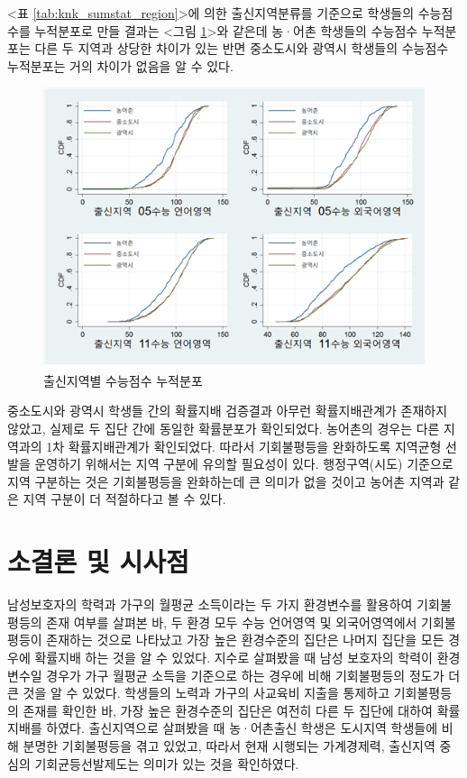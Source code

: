 

<표 \ref{tab:knk_sumstat_region}>에 의한 출신지역분류를 기준으로 학생들의 수능점수를 누적분포로 만들 결과는 <그림 \ref{fig:knk_cdf_region}>와 같은데 농·어촌 학생들의 수능점수 누적분포는 다른 두 지역과 상당한 차이가 있는 반면 중소도시와 광역시 학생들의 수능점수 누적분포는 거의 차이가 없음을 알 수 있다.

\begin{figure}
    \centering
    \includegraphics[width=140mm]{figure/knk_cdf_region.png}
    \caption{출신지역별 수능점수 누적분포}
    \label{fig:knk_cdf_region}
\end{figure}

중소도시와 광역시 학생들 간의 확률지배 검증결과 아무런 확률지배관계가 존재하지 않았고, 실제로 두 집단 간에 동일한 확률분포가 확인되었다.
농어촌의 경우는 다른 지역과의 1차 확률지배관계가 확인되었다.
 따라서 기회불평등을 완화하도록 지역균형 선발을 운영하기 위해서는 지역 구분에 유의할 필요성이 있다. 행정구역(시도) 기준으로 지역 구분하는 것은 기회불평등을 완화하는데 큰 의미가 없을 것이고 농어촌 지역과 같은 지역 구분이 더 적절하다고 볼 수 있다.
 
 \section{소결론 및 시사점}

남성보호자의 학력과 가구의 월평균 소득이라는 두 가지 환경변수를 활용하여 기회불평등의 존재 여부를 살펴본 바, 두 환경 모두 수능 언어영역 및 외국어영역에서 기회불평등이 존재하는 것으로 나타났고 가장 높은 환경수준의 집단은 나머지 집단을 모든 경우에 확률지배 하는 것을 알 수 있었다.
지수로 살펴봤을 때 남성 보호자의 학력이 환경변수일 경우가 가구 월평균 소득을 기준으로 하는 경우에 비해 기회불평등의 정도가 더 큰 것을 알 수 있었다.
 학생들의 노력과 가구의 사교육비 지출을 통제하고 기회불평등의 존재를 확인한 바, 가장 높은 환경수준의 집단은 여전히 다른 두 집단에 대하여 확률지배를 하였다.
 출신지역으로 살펴봤을 때 농·어촌출신 학생은 도시지역 학생들에 비해 분명한 기회불평등을 겪고 있었고, 따라서 현재 시행되는 가계경제력, 출신지역 중심의 기회균등선발제도는 의미가 있는 것을 확인하였다.
  
